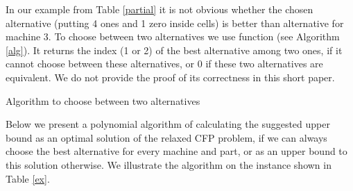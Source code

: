 \documentclass[citeauthoryear]{llncs}
\begin{document}
In our example from Table \ref{partial} it is not obvious whether the chosen alternative  (putting 4 ones and 1 zero inside cells) is better than alternative  for machine 3. To choose between two alternatives we use  function (see Algorithm \ref{alg}).
It returns the index (1 or 2) of the best alternative among two ones,  if it cannot choose between these alternatives, or 0 if these two alternatives are equivalent.
We do not provide the proof of its correctness in this short paper.

\begin{algorithm}
\caption{Algorithm to choose between two alternatives}
\label{alg}
\begin{algorithmic}
 \State  {}

 \If {}
  \If {}
   \State {}
  \ElsIf {}
   \State {}
  \Else
   \State {}
  \EndIf
 \EndIf

 \State 

 \If {}
  \State {}
 \EndIf

 \If {}
  \State {}
 \EndIf

 \State {}

\EndFunction
\end{algorithmic}
\end{algorithm}

Below we present a polynomial algorithm of calculating the suggested upper bound as an optimal solution of the relaxed CFP problem, if we can always choose the best alternative for every machine and part, or as an upper bound to this solution otherwise.
We illustrate the algorithm on the instance shown in Table \ref{ex}.
\end{document}
